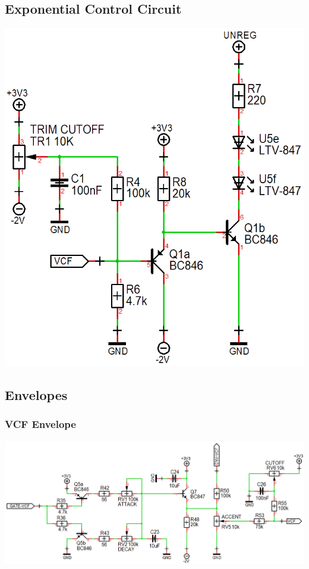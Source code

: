 \documentclass{scrartcl}
\begin{document}
\subsection{Exponential Control Circuit}

\begin{center}
    \includegraphics[scale=0.42]{assets/schema-expo.png}
\end{center}

\subsection{Envelopes}

\subsubsection{VCF Envelope}

\begin{center}
    \includegraphics[scale=0.36]{assets/schema-ar.png}
\end{center}
\end{document}
